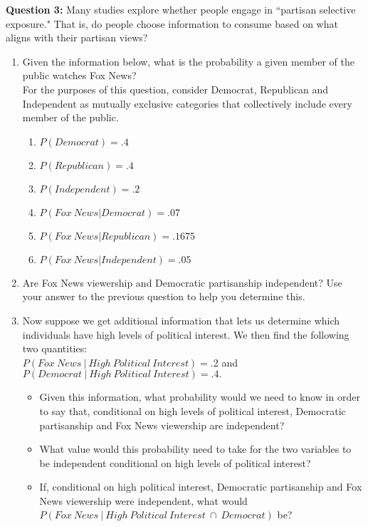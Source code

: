 \documentclass[10pt]{amsart}
\begin{document}
\textbf{Question 3:}
Many studies explore whether people engage in ``partisan selective exposure." That is, do people choose information to consume based on what aligns with their partisan views?
\begin{enumerate}
\item Given the information below, what is the probability a given member of the public watches Fox News?\\

For the purposes of this question, consider Democrat, Republican and Independent as mutually exclusive categories that collectively include every member of the public.

\begin{multicols}{2}
\begin{enumerate}
\item[] $P(Democrat) = .4$
\item[] $P(Republican) = .4$
\item[] $P(Independent) = .2$
\item[] $P(Fox \ News | Democrat) = .07$
\item[] $P(Fox \ News | Republican) = .1675$
\item[] $P(Fox \ News | Independent) = .05$
\end{enumerate}
\end{multicols}

\item Are Fox News viewership and Democratic partisanship independent? Use your answer to the previous question to help you determine this. 

\item Now suppose we get additional information that lets us determine which individuals have high levels of political interest. We then find the following two quantities: \\
$P(Fox \ News \  | \ High \ Political  \ Interest) = .2$ and  $P(Democrat \ |  \ High \ Political  \ Interest) = .4.$
	\begin{itemize}
	\item Given this information, what probability would we need to know in order to say that, conditional on high levels of political interest, Democratic partisanship and Fox News viewership are independent?
	 \item What value would this probability need to take for the two variables to be independent conditional on high levels of political interest?
	 \item If, conditional on high political interest, Democratic partisanship and Fox News viewership were independent, what would $P(Fox \ News \ | \ High \ Political \ Interest \ \cap \ Democrat)$ be?
	\end{itemize}
\end{enumerate}
\end{document}
